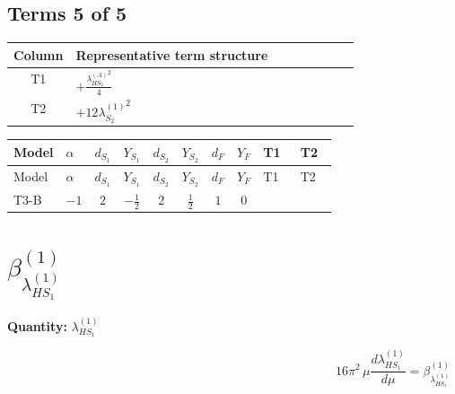 \documentclass[8pt]{article}
\begin{document}
\begin{landscape}
\subsection*{Terms 5 of 5}
\begin{center}
\begin{tabular}{@{}c >{\raggedright\arraybackslash}p{0.82\linewidth}@{}}
\toprule
Column & Representative term structure \\
\midrule
T1 & \(\displaystyle +\frac{{\lambda_{HS_2}^{(A)}}^2}{4}\) \\
\midrule
T2 & \(\displaystyle +12 {\lambda_{S_2}^{(1)}}^2\) \\
\midrule
\bottomrule
\end{tabular}
\end{center}
\smallskip
\tiny
\begin{longtable}{@{}llcccccc >{\raggedright\arraybackslash}p{0.21\linewidth} >{\raggedright\arraybackslash}p{0.21\linewidth}@{}}
\toprule
Model & $\alpha$ & $d_{S_1}$ & $Y_{S_1}$ & $d_{S_2}$ & $Y_{S_2}$ & $d_F$ & $Y_F$ & T1 & T2 \\
\midrule
\endfirsthead
\toprule
Model & $\alpha$ & $d_{S_1}$ & $Y_{S_1}$ & $d_{S_2}$ & $Y_{S_2}$ & $d_F$ & $Y_F$ & T1 & T2 \\
\midrule
\endhead
T3-B & $-1$ & $2$ & $-\frac{1}{2}$ & $2$ & $\frac{1}{2}$ & $1$ & $0$ & \scriptsize\adjustbox{max width=\linewidth}{$\begin{gathered} +\frac{{\lambda_{HS_2}^{(A)}}^2}{4}\end{gathered}$} & \scriptsize\adjustbox{max width=\linewidth}{$\begin{gathered} +12 {\lambda_{S_2}^{(1)}}^2\end{gathered}$} \\
\midrule
\bottomrule
\end{longtable}
\clearpage
\section*{$\beta_{\lambda_{HS_1}^{(1)}}^{(1)}$}
\noindent\textbf{Quantity: }$\lambda_{HS_1}^{(1)}$\par\smallskip
\[16\pi^2\,\mu\frac{d \lambda_{HS_1}^{(1)}}{d\mu}=\beta_{\lambda_{HS_1}^{(1)}}^{(1)}\]

\end{landscape}
\end{document}
